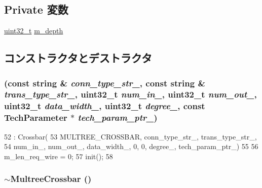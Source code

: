 \subsection*{Private 変数}
\begin{DoxyCompactItemize}
\item 
\hyperlink{Type_8hh_a435d1572bf3f880d55459d9805097f62}{uint32\_\-t} \hyperlink{classMultreeCrossbar_ad2e5a4e92c8ac5d402e25cc729040a8b}{m\_\-depth}
\end{DoxyCompactItemize}


\subsection{コンストラクタとデストラクタ}
\hypertarget{classMultreeCrossbar_a3c72c228bf72e9815ff90b3ad1fe74fb}{
\subsubsection[{MultreeCrossbar}]{ (const string \& {\em conn\_\-type\_\-str\_\-}, \/  const string \& {\em trans\_\-type\_\-str\_\-}, \/  {\bf uint32\_\-t} {\em num\_\-in\_\-}, \/  {\bf uint32\_\-t} {\em num\_\-out\_\-}, \/  {\bf uint32\_\-t} {\em data\_\-width\_\-}, \/  {\bf uint32\_\-t} {\em degree\_\-}, \/  const {\bf TechParameter} $\ast$ {\em tech\_\-param\_\-ptr\_\-})}}
\label{classMultreeCrossbar_a3c72c228bf72e9815ff90b3ad1fe74fb}



\begin{DoxyCode}
52           : Crossbar(
53             MULTREE_CROSSBAR, conn_type_str_, trans_type_str_,
54             num_in_, num_out_, data_width_, 0, 0, degree_, tech_param_ptr_)
55 {
56     m_len_req_wire = 0;
57     init();
58 }
\end{DoxyCode}
\hypertarget{classMultreeCrossbar_a2f3440d960819851a8c2bd0599eb5bde}{
\subsubsection[{$\sim$MultreeCrossbar}]{\setlength{\rightskip}{0pt plus 5cm}$\sim${\bf MultreeCrossbar} ()}}
\label{classMultreeCrossbar_a2f3440d960819851a8c2bd0599eb5bde}



